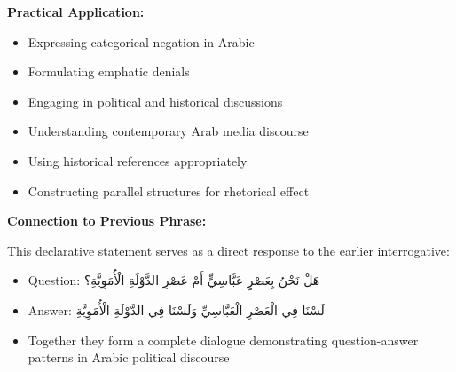 \documentclass[letterpaper,12pt]{article}
\begin{document}
\begin{tcolorbox}[colback=boxcolor,colframe=accentcolor,breakable]
\textbf{Practical Application:}
\begin{itemize}
\item Expressing categorical negation in Arabic
\item Formulating emphatic denials
\item Engaging in political and historical discussions
\item Understanding contemporary Arab media discourse
\item Using historical references appropriately
\item Constructing parallel structures for rhetorical effect
\end{itemize}

\vspace{0.5em}
\textbf{Connection to Previous Phrase:}

This declarative statement serves as a direct response to the earlier interrogative:
\begin{itemize}
\item Question: \textarabic{هَلْ نَحْنُ بِعَصْرٍ عَبَّاسِيٍّ أَمْ عَصْرِ الدَّوْلَةِ الْأُمَوِيَّةِ؟}
\item Answer: \textarabic{لَسْنَا فِي الْعَصْرِ الْعَبَّاسِيِّ وَلَسْنَا فِي الدَّوْلَةِ الْأُمَوِيَّةِ}
\item Together they form a complete dialogue demonstrating question-answer patterns in Arabic political discourse
\end{itemize}
\end{tcolorbox}
\end{document}
